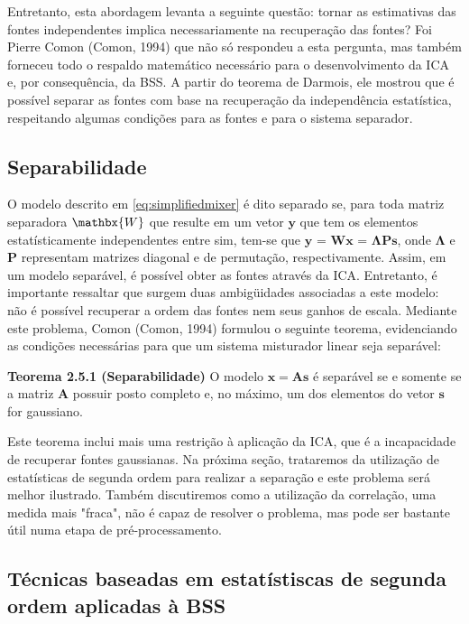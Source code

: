     Entretanto, esta abordagem levanta a seguinte questão: tornar as estimativas das fontes independentes implica necessariamente na recuperação das fontes? Foi Pierre Comon (Comon, 1994) que não só respondeu a esta pergunta, mas também forneceu todo o respaldo matemático necessário para o desenvolvimento da ICA e, por consequência, da BSS.
    A partir do teorema de Darmois, ele mostrou que é possível separar as fontes com base na recuperação da independência estatística, respeitando algumas condições para as fontes e para o sistema separador.

\subsection{Separabilidade}\label{sec:separability}

    O modelo descrito em \ref{eq:simplifiedmixer} é dito separado se, para toda matriz separadora $\mathbx{W}$ que resulte em um vetor $\mathbf{y}$ que tem os elementos estatísticamente independentes entre sim, tem-se que $\mathbf{y}$ = $\mathbf{Wx}$ = $\mathbf{\Lambda P s}$, onde $\mathbf{\Lambda}$ e $\mathbf{P}$ representam matrizes diagonal e de permutação, respectivamente. Assim, em um modelo separável, é possível obter as fontes através da ICA. Entretanto, é importante ressaltar que surgem duas ambigüidades associadas a este modelo: não é possível recuperar a ordem das fontes nem seus ganhos de escala. Mediante este problema, Comon \nocite{Common} (Comon, 1994) formulou o seguinte teorema, evidenciando as condições necessárias para que um sistema misturador linear seja separável:
    
    \bigskip
    
    \textbf{Teorema 2.5.1 (Separabilidade)} O modelo $\mathbf{x} = \mathbf{As}$ é separável se e somente se a matriz $\mathbf{A}$ possuir posto completo e, no máximo, um dos elementos do vetor $\mathbf{s}$ for gaussiano.
    
    \bigskip
    
    Este teorema inclui mais uma restrição à aplicação da ICA, que é a incapacidade de recuperar fontes gaussianas. Na próxima seção, trataremos da utilização de estatísticas de segunda ordem para realizar a separação e este problema será melhor ilustrado. Também discutiremos como a utilização da correlação, uma medida mais "fraca", não é capaz de resolver o problema, mas pode ser bastante útil numa etapa de pré-processamento.
  
\subsection{Técnicas baseadas em estatístiscas de segunda ordem aplicadas à BSS}

